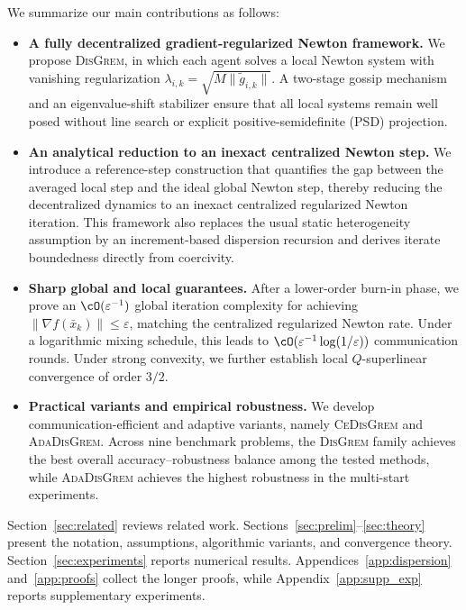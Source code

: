 \documentclass[review,onefignum,onetabnum]{siamart171218}
\begin{document}
We summarize our main contributions as follows:
\begin{itemize}[leftmargin=1.5em]
\item \textbf{A fully decentralized gradient-regularized Newton framework.}
We propose \textsc{DisGrem}, in which each agent solves a local Newton system
with vanishing regularization $\lambda_{i,k}=\sqrt{M\|\tilde g_{i,k}\|}$.
A two-stage gossip mechanism and an eigenvalue-shift stabilizer ensure that
all local systems remain well posed without line search or explicit positive-semidefinite (PSD) projection.

\item \textbf{An analytical reduction to an inexact centralized Newton step.}
We introduce a reference-step construction that quantifies the gap between the
averaged local step and the ideal global Newton step, thereby reducing the
decentralized dynamics to an inexact centralized regularized Newton iteration.
This framework also replaces the usual static heterogeneity assumption by an
increment-based dispersion recursion and derives iterate boundedness directly
from coercivity.

\item \textbf{Sharp global and local guarantees.}
After a lower-order burn-in phase, we prove an $\cO(\varepsilon^{-1})$ global
iteration complexity for achieving $\|\nabla f(\bar x_k)\|\le\varepsilon$,
matching the centralized regularized Newton rate. Under a logarithmic
mixing schedule, this leads to $\cO(\varepsilon^{-1}\log(1/\varepsilon))$
communication rounds.
Under strong convexity, we further establish local $Q$-superlinear convergence
of order $3/2$.

\item \textbf{Practical variants and empirical robustness.}
We develop communication-efficient and adaptive variants, namely
\textsc{CeDisGrem} and \textsc{AdaDisGrem}. Across nine benchmark problems,
the \textsc{DisGrem} family achieves the best overall accuracy--robustness
balance among the tested methods, while \textsc{AdaDisGrem} achieves the
highest robustness in the multi-start experiments.
\end{itemize}

Section~\ref{sec:related} reviews related work.
Sections~\ref{sec:prelim}--\ref{sec:theory} present the notation, assumptions, algorithmic variants, and convergence theory.
Section~\ref{sec:experiments} reports numerical results.
Appendices~\ref{app:dispersion} and~\ref{app:proofs} collect the longer proofs, while Appendix~\ref{app:supp_exp} reports supplementary experiments.
\end{document}
